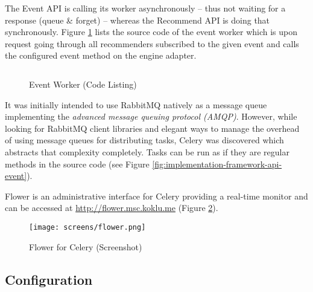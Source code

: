 The Event API is calling its worker asynchronously -- thus not waiting for a response (queue \& forget) -- whereas the Recommend API is doing that synchronously. Figure \ref{fig:implementation-framework-worker} lists the source code of the event worker which is upon request going through all recommenders subscribed to the given event and calls the configured event method on the engine adapter.

\begin{figure}[ht]
    \inputminted{py}{./includes/source/framework/worker/event.py}
    \caption{Event Worker (Code Listing)}
    \label{fig:implementation-framework-worker}
\end{figure}

It was initially intended to use RabbitMQ natively as a message queue implementing the \emph{advanced message queuing protocol (AMQP)}. However, while looking for RabbitMQ client libraries and elegant ways to manage the overhead of using message queues for distributing tasks, Celery was discovered which abstracts that complexity completely. Tasks can be run as if they are regular methods in the source code (see Figure \ref{fig:implementation-framework-api-event}).

Flower is an administrative interface for Celery providing a real-time monitor and can be accessed at \url{http://flower.msc.koklu.me} (Figure \ref{fig:implementation-framework-flower}).

\begin{figure}[ht]
    \texttt{[image: screens/flower.png]}
    \caption{Flower for Celery (Screenshot)}
    \label{fig:implementation-framework-flower}
\end{figure}

\subsection{Configuration}

